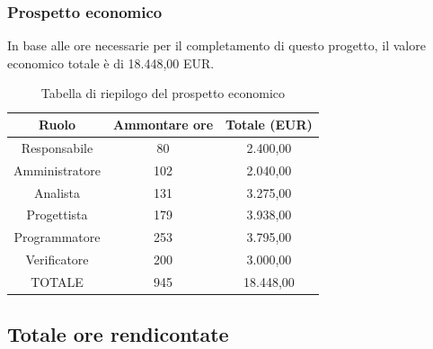 \subsubsection{Prospetto economico}
In base alle ore necessarie per il completamento di questo progetto, il valore economico totale è di 18.448,00 EUR.
\begin{table}[h]
\caption{Tabella di riepilogo del prospetto economico}
\begin{center}
\begin{tabular}{ |c|c|c|  }
 \hline
 Ruolo 		& Ammontare ore 	& Totale (EUR)\\
 \hline
 \hline
 	Responsabile	& 80 		& 2.400,00\\
	Amministratore	& 102		& 2.040,00\\
	Analista		& 131 		& 3.275,00\\
	Progettista		& 179		& 3.938,00\\
	Programmatore	& 253		& 3.795,00\\
	Verificatore	& 200 		& 3.000,00\\
 \hline\hline
 TOTALE		& 945		& 18.448,00\\
  \hline
\end{tabular}
\end{center}
\end{table}

\newpage
\subsection{Totale ore rendicontate}
